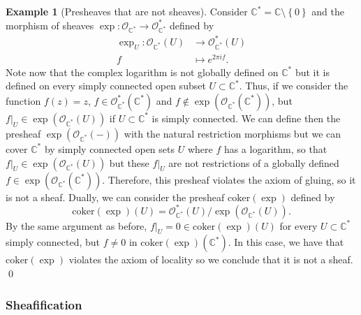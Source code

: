 \documentclass[12pt,a4paper]{book}
\theoremstyle{definition} \newtheorem{defn}[thm]{Definition}
\theoremstyle{definition} \newtheorem{ejemplo}[thm]{Example}
\theoremstyle{definition} \newtheorem{ejercicio}[thm]{Exercise}
\theoremstyle{remark} \newtheorem*{obs}{Remark}
\def\CC{\mathbb{C}}
\def\coker{\mathrm{coker}}
\def\OO{\mathscr{O}}
\begin{document}
     \begin{ejemplo}[Presheaves that are not sheaves]
	 Consider $\CC^*=\CC\setminus \left\{ 0 \right\}$ and the morphism of sheaves $\exp:\OO_{\CC^*} \rightarrow \OO_{\CC^*}^*$ defined by
	   \begin{align*}
	     \exp_U :\OO_{\CC^*}(U)&\longrightarrow \OO^*_{\CC^*}(U)\\ 
	     f &\longmapsto e^{2\pi i f}. 
	     \end{align*}
	     Note now that the complex logarithm is not globally defined on $\CC^*$ but it is defined on every simply connected open subset $U\subset \CC^*$. Thus, if we consider the function $f(z)=z$, $f\in \OO_{\CC^*}^*(\CC^*)$ and $f\not \in \exp(\OO_{\CC^*}(\CC^*))$, but $f|_U\in \exp(\OO_{\CC^*}(U))$ if $U\subset \CC^*$ is simply connected. We can define then the presheaf $\exp(\OO_{\CC^*}(-))$ with the natural restriction morphisms but we can cover $\CC^*$ by simply connected open sets $U$ where $f$ has a logarithm, so that $f|_U \in \exp(\OO_{\CC^*}(U))$ but these $f|_U$ are not restrictions of a globally defined $f\in \exp(\OO_{\CC^*}(\CC^*))$. Therefore, this presheaf violates the axiom of gluing, so it is not a sheaf. Dually, we can consider the presheaf $\coker(\exp)$ defined by
	     \begin{equation*}
	       \coker(\exp)(U)=\OO^*_{\CC^*}(U)/\exp(\OO_{\CC^*}(U)).
	     \end{equation*}
	     By the same argument as before, $f|_U=0 \in \coker(\exp)(U)$ for every $U\subset \CC^*$ simply connected, but $f \neq 0$ in $\coker(\exp)(\CC^*)$. In this case, we have that $\coker(\exp)$ violates the axiom of locality so we conclude that it is not a sheaf.
\qed
     \end{ejemplo}
     \subsubsection{Sheafification}
\end{document}
